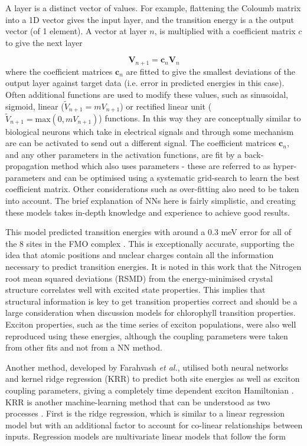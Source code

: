 A layer is a distinct vector of values. For example, flattening the Coloumb matrix
into a 1D vector gives the input layer, and the \Qy transition energy is a the output 
vector (of 1 element). A vector at layer $n$, is multiplied with a coefficient matrix 
$c$ to give the next layer

\begin{equation}
	\mathbf{V}_{n+1} = \mathbf{c}_n \mathbf{V}_n	
\end{equation}
%
where the coefficient matrices $\mathbf{c}_n$ are fitted to give the smallest deviations
of the output layer against target data (i.e. error in predicted \Qy energies in 
this case). Often additional functions are used to modify these values, such as
sinusoidal, sigmoid, linear ($\tilde{V}_{n+1}=m V_{n+1}$) or rectified linear unit 
($\tilde{V}_{n+1}=\text{max}\left(0, m V_{n+1} \right)$) functions. In this way they 
are conceptually similar to biological neurons which take in electrical signals 
and through some mechanism are can be activated to send out a different signal. 
The coefficient matrices $\mathbf{c}_n$, and any other parameters in the activation
functions, are fit by a back-propagation method which also uses parameters - these 
are referred to as hyper-parameters and can be optimised using a systematic grid-search
to learn the best coefficient matrix. Other considerations such as over-fitting 
also need to be taken into account. The brief explanation of NNs here is fairly 
simplistic, and creating these models takes in-depth knowledge and experience to
achieve good results.

This model predicted \Qy transition energies with around a 0.3 meV error for all
of the 8 sites in the FMO complex \cite{AspuruGuzik2016}. This is exceptionally
accurate, supporting the idea that atomic positions and nuclear charges contain 
all the information necessary to predict transition energies. It is noted in this
work that the Nitrogen root mean squared deviations (RSMD) from the energy-minimised
crystal structure correlates well with excited state properties. This implies that
structural information is key to get transition properties correct and should be
a large consideration when discussion models for chlorophyll transition properties.
Exciton properties, such as the time series of exciton populations, were also well 
reproduced using these \Qy energies, although the coupling parameters were taken 
from other fits and not from a NN method.

Another method, developed by Farahvash \emph{et al.}, utilised both neural networks
and kernel ridge regression (KRR) to predict both site energies as well as exciton 
coupling parameters, giving a completely time dependent exciton Hamiltonian \cite{Farahvash2020}. 
KRR is another machine-learning method that can be understood as two processes \cite{Hastie2009}. 
First is the ridge regression, which is similar to a linear regression model but 
with an additional factor to account for co-linear relationships between inputs.
Regression models are multivariate linear models that follow the form

